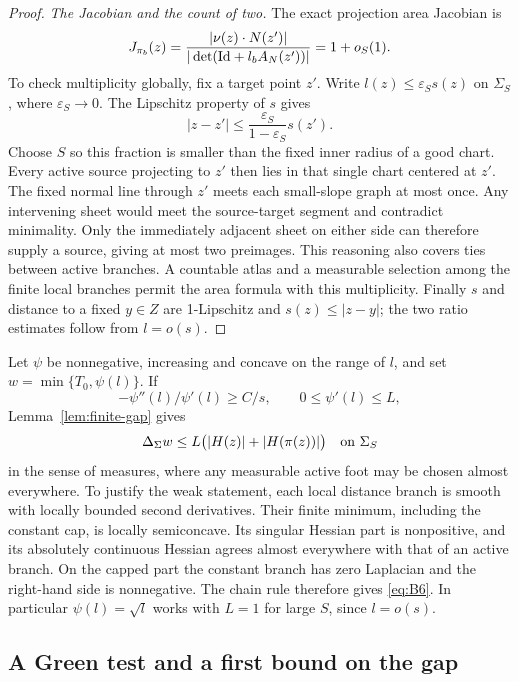 \begin{proof}
\emph{The Jacobian and the count of two.}
The exact projection area Jacobian is
\begin{equation}\label{eq:finite-foot-jacobian}
 J_{\pi_b}(z)
  =\frac{|\nu(z)\cdot N(z')|}
         {|\det(\mathrm{Id}+l_b A_N(z'))|}
  =1+o_S(1).
\end{equation}
To check multiplicity globally, fix a target point \(z'\).
Write \(l(z)\le\varepsilon_S s(z)\) on \(\Sigma_S\), where
\(\varepsilon_S\to0\).  The Lipschitz property of \(s\) gives
\[
 |z-z'|\le\frac{\varepsilon_S}{1-\varepsilon_S}s(z').
\]
Choose \(S\) so this fraction is smaller than the fixed inner radius
of a good chart.  Every active source projecting to \(z'\) then
lies in that single chart centered at \(z'\).
The fixed normal line through \(z'\) meets each small-slope graph
at most once.  Any intervening sheet would meet the source-target
segment and contradict minimality.  Only the immediately adjacent
sheet on either side can therefore supply a source, giving at most
two preimages.  This reasoning also covers ties between active branches.
A countable atlas and a measurable selection among the finite local
branches permit the area formula with this multiplicity.
Finally \(s\) and distance to a fixed \(y\in Z\) are 1-Lipschitz and
\(s(z)\le|z-y|\); the two ratio estimates follow from \(l=o(s)\).
\end{proof}

Let \(\psi\) be nonnegative, increasing and concave on the range of \(l\), and set
\(w=\min\{T_0,\psi(l)\}\).  If
\[
 -\psi''(l)/\psi'(l)\ge C/s,\qquad 0\le\psi'(l)\le L,
\]
Lemma~\ref{lem:finite-gap} gives
\begin{equation}\label{eq:B6}
 \Delta_\Sigma w\le L\bigl(|H(z)|+|H(\pi(z))|\bigr)
 \quad\hbox{on }\Sigma_S
\end{equation}
in the sense of measures, where any measurable active foot may be
chosen almost everywhere.  To justify the weak statement, each local
distance branch is smooth with locally bounded second derivatives.
Their finite minimum, including the constant cap, is locally semiconcave.
Its singular Hessian part is nonpositive, and its absolutely continuous
Hessian agrees almost everywhere with that of an active branch.
On the capped part the constant branch has zero Laplacian and the
right-hand side is nonnegative.  The chain rule therefore gives
\eqref{eq:B6}.  In particular \(\psi(l)=\sqrt l\) works with \(L=1\)
for large \(S\), since \(l=o(s)\).

\subsection{A Green test and a first bound on the gap}

